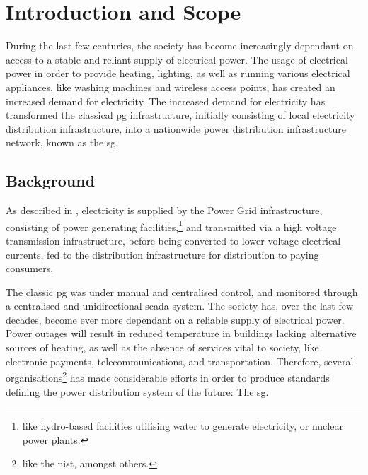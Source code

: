 
\chapter{Introduction and Scope} 


During the last few centuries, the society  has become increasingly dependant on access to a stable and reliant supply of electrical power. The usage of electrical power in order to provide heating, lighting, as well as running various electrical appliances, like washing machines and wireless access points, has created an increased demand for electricity. The increased demand for electricity has transformed the classical \acrfull{pg} infrastructure, initially consisting of local electricity distribution infrastructure,  into a nationwide power distribution infrastructure network, known as the \acrfull{sg}.







\section{Background}
As described in \cite{BlumeStevenW2007Epsb}, electricity is supplied by the Power Grid infrastructure, consisting of power generating facilities,\footnote{like hydro-based facilities utilising water to generate electricity, or nuclear power plants.} and transmitted via a high voltage transmission infrastructure, before being converted to  lower voltage electrical currents, fed to the distribution infrastructure for distribution to paying consumers.


The classic \acrlong{pg} was under manual and centralised control, and monitored through a centralised and unidirectional \acrfull{scada} system.
The society has, over the last few decades, become ever more dependant on a reliable supply of electrical power. Power outages will result in reduced temperature in buildings lacking alternative sources of heating, as well as the absence of services vital to society, like electronic payments, telecommunications, and transportation.
Therefore, several organisations\footnote{like the \acrfull{nist}, amongst others.} has made considerable efforts in order to produce standards defining the  power distribution system of the future: The \acrfull{sg}.



